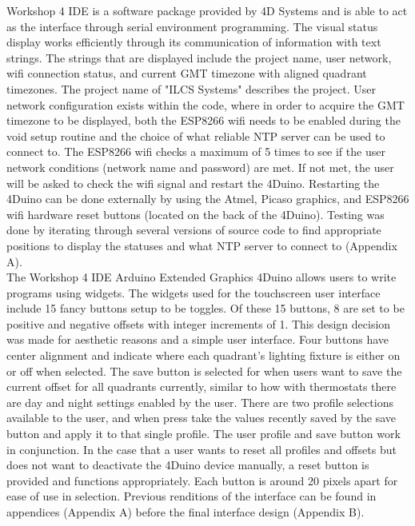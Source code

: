 \documentclass[12pt,a4paper]{report}
\begin{document}
Workshop 4 IDE is a software package provided by 4D Systems and is able to act as the interface through serial environment programming. The visual status display works efficiently through its communication of information with text strings. The strings that are displayed include the project name, user network, wifi connection status, and current GMT timezone with aligned quadrant timezones. The project name of "ILCS Systems" describes the project. User network configuration exists within the code, where in order to acquire the GMT timezone to be displayed, both the ESP8266 wifi needs to be enabled during the void setup routine and the choice of what reliable NTP server can be used to connect to. The ESP8266 wifi checks a maximum of 5 times to see if the user network conditions (network name and password) are met. If not met, the user will be asked to check the wifi signal and restart the 4Duino. Restarting the 4Duino can be done externally by using the Atmel, Picaso graphics, and ESP8266 wifi hardware reset buttons (located on the back of the 4Duino). Testing was done by iterating through several versions of source code to find appropriate positions to display the statuses and what NTP server to connect to (Appendix A). \\

The Workshop 4 IDE Arduino Extended Graphics 4Duino allows users to write programs using widgets. The widgets used for the touchscreen user interface include 15 fancy buttons setup to be toggles. Of these 15 buttons, 8 are set to be positive and negative offsets with integer increments of 1. This design decision was made for aesthetic reasons and a simple user interface. Four buttons have center alignment and indicate where each quadrant's lighting fixture is either on or off when selected. The save button is selected for when users want to save the current offset for all quadrants currently, similar to how with thermostats there are day and night settings enabled by the user. There are two profile selections available to the user, and when press take the values recently saved by the save button and apply it to that single profile. The user profile and save button work in conjunction. In the case that a user wants to reset all profiles and offsets but does not want to deactivate the 4Duino device manually, a reset button is provided and functions appropriately. Each button is around 20 pixels apart for ease of use in selection. Previous renditions of the interface can be found in appendices (Appendix A) before the final interface design (Appendix B). \\
\end{document}

